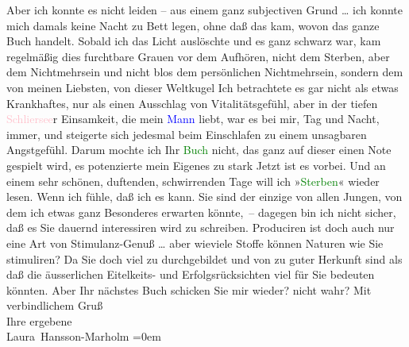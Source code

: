            Aber ich konnte es nicht leiden – aus einem ganz subjectiven Grund {\dots} ich konnte mich damals keine Nacht zu Bett legen,
                    ohne daß das kam, wovon das ganze Buch handelt. Sobald ich das Licht auslöschte
                    und es ganz schwarz war, kam regelmäßig dies furchtbare Grauen vor dem Aufhören,
                    nicht dem Sterben, aber dem Nichtmehrsein und nicht blos dem persönlichen
                    Nichtmehrsein, sondern dem von meinen Liebsten, von dieser Weltkugel{\dotsfour} Ich betrachtete es gar nicht als etwas
                    Krankhaftes, nur als einen Ausschlag von Vitalitätsgefühl, aber in der tiefen
                        \textcolor{pink}{Schliersee}{}\ledrightnote{\textcolor{pink}{Schliersee}}r Einsamkeit, die mein \textcolor{blue}{Mann}{} liebt, war es bei mir,
                    Tag und Nacht, immer, und steigerte sich jedesmal beim Einschlafen zu einem
                    unsagbaren Angstgefühl. Darum mochte ich Ihr \textcolor{green}{Buch}{} nicht, das ganz auf dieser einen Note gespielt
                    wird, es potenzierte mein Eigenes zu stark{\dotsfour}\pend
           \pstart
           Jetzt ist es vorbei. Und an einem sehr schönen, duftenden, schwirrenden Tage will
                    ich »\textcolor{green}{Sterben}{}\ledrightnote{\textcolor{green}{Sterben. Novelle}}« wieder lesen. Wenn ich fühle,
                    daß {\pb}ich es
                    kann.\pend
           \pstart
           Sie sind der einzige von allen Jungen, von dem ich etwas ganz Besonderes erwarten
                    könnte, – dagegen bin ich nicht sicher, daß es Sie dauernd interessiren wird zu
                    schreiben. Produciren ist doch auch nur eine Art von Stimulanz-Genuß {\dots} aber wieviele Stoffe können Naturen wie Sie
                    stimuliren? Da Sie doch viel zu durchgebildet und von zu guter Herkunft sind als
                    daß die äusserlichen Eitelkeits- und Erfolgsrücksichten viel für Sie bedeuten
                    könnten.\pend
           \pstart
           Aber Ihr nächstes Buch schicken Sie mir wieder? nicht wahr?\pend
           \pstart
           Mit verbindlichem Gruß{\\[\baselineskip]} Ihre ergebene{\\[\baselineskip]}\spacefill\mbox{Laura Hansson-Marholm}\pend
           \leftskip=0em{}\endnumbering{}  
      